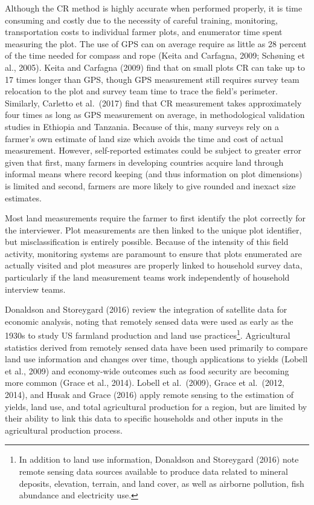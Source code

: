 \documentclass[
]{book}
\begin{document}
Although the CR method is highly accurate when performed properly, it is time consuming and costly due to the necessity of careful training, monitoring, transportation costs to individual farmer plots, and enumerator time spent measuring the plot. The use of GPS can on average require as little as 28 percent of the time needed for compass and rope (Keita and Carfagna, 2009; Schøning et al., 2005). Keita and Carfagna (2009) find that on small plots CR can take up to 17 times longer than GPS, though GPS measurement still requires survey team relocation to the plot and survey team time to trace the field's perimeter. Similarly, Carletto et al.~(2017) find that CR measurement takes approximately four times as long as GPS measurement on average, in methodological validation studies in Ethiopia and Tanzania. Because of this, many surveys rely on a farmer's own estimate of land size which avoids the time and cost of actual measurement. However, self-reported estimates could be subject to greater error given that first, many farmers in developing countries acquire land through informal means where record keeping (and thus information on plot dimensions) is limited and second, farmers are more likely to give rounded and inexact size estimates.

Most land measurements require the farmer to first identify the plot correctly for the interviewer. Plot measurements are then linked to the unique plot identifier, but misclassification is entirely possible. Because of the intensity of this field activity, monitoring systems are paramount to ensure that plots enumerated are actually visited and plot measures are properly linked to household survey data, particularly if the land measurement teams work independently of household interview teams.

Donaldson and Storeygard (2016) review the integration of satellite data for economic analysis, noting that remotely sensed data were used as early as the 1930s to study US farmland production and land use practices\footnote{In addition to land use information, Donaldson and Storeygard (2016) note remote sensing data sources available to produce data related to mineral deposits, elevation, terrain, and land cover, as well as airborne pollution, fish abundance and electricity use.}. Agricultural statistics derived from remotely sensed data have been used primarily to compare land use information and changes over time, though applications to yields (Lobell et al., 2009) and economy-wide outcomes such as food security are becoming more common (Grace et al., 2014). Lobell et al.~(2009), Grace et al.~(2012, 2014), and Husak and Grace (2016) apply remote sensing to the estimation of yields, land use, and total agricultural production for a region, but are limited by their ability to link this data to specific households and other inputs in the agricultural production process.
\end{document}

